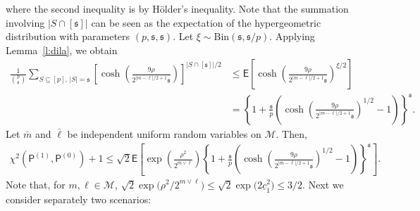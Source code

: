 \documentclass[11pt, a4paper]{article}
\newcommand{\mc}{\mathcal}
\renewcommand{\l}{\left}
\renewcommand{\r}{\right}
\newcommand{\E}[0]{\mathsf{E}}
\newcommand{\p}{\mathsf{P}}
\theoremstyle{definition}
\theoremstyle{definition}
\theoremstyle{definition}
\theoremstyle{definition}
\theoremstyle{definition}
\theoremstyle{remark}
\theoremstyle{definition}
\theoremstyle{definition}
\theoremstyle{definition}
\begin{document}
where the second inequality is by Hölder's inequality. Note that the summation involving $\vert S \cap [\mathfrak s]\vert$ can be seen as the expectation of the hypergeometric distribution with parameters $(p, \mathfrak{s}, \mathfrak{s})$. Let $\xi \sim \mathrm{Bin}(\mathfrak{s}, \mathfrak{s}/p)$. Applying Lemma~\ref{l:dila}, we obtain
\begin{align*}
\frac{1}{{p \choose \mathfrak{s}}}\sum_{S \subseteq [p],\, \vert S\vert = \mathfrak{s}} \l[\cosh\l( \frac{9\rho  }{2^{\vert m-\ell\vert/2+1}\mathfrak{s}}\r)\r]^{\vert S \cap [\mathfrak s]\vert/2} 
& \le  \E \l[\cosh\l(  \frac{9\rho  }{2^{\vert m-\ell\vert/2+1}\mathfrak{s}}\r)^{\xi /2}\r]\\
& = \l\{ 1 + \frac{\mathfrak{s}}{p}\l( \cosh\l( \frac{9\rho  }{2^{\vert m-\ell\vert/2+1}\mathfrak{s}}\r)^{1/2} - 1 \r)\r\}^{\mathfrak{s}}.
\end{align*}
Let $\bar{m}$ and $\bar{\ell}$ be independent uniform random variables on $\mc M$. Then, 
\begin{align*}
\chi^2(\p^{(1)},\p^{(0)}) + 1 \le  \sqrt{2}\E\l[\exp\l(\frac{\rho^2}{2^{\bar{m}\vee \bar{\ell}}}\r)\l\{ 1 + \frac{\mathfrak{s}}{p}\l( \cosh\l( \frac{9\rho  }{2^{\vert \bar{m}-\bar{\ell}\vert/2+1}\mathfrak{s}}\r)^{1/2} - 1 \r)\r\}^{\mathfrak{s}}\r].
\end{align*}
Note that, for $m,\ell\in\mc M$, $\sqrt{2}\exp\bigl(\rho^2/2^{m\vee\ell}\bigr) \le \sqrt{2} \exp\bigl(2\underline{c}_1^2\bigr) \le 3/2.$ Next we consider separately two scenarios:
\end{document}

